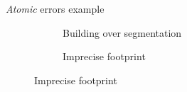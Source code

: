\documentclass{beamer}
\begin{document}
\begin{frame}{\emph{Atomic} errors example}
{\begin{figure}
\begin{center}
                            \hspace{10pt}
                            \begin{subfigure}{.28\textwidth}
                                \caption{\label{fig::bul_over} Building over segmentation}
                            \end{subfigure}
                            \hspace{10pt}
                            \begin{subfigure}{.28\textwidth}
                                \caption{\label{fig::bul_footprint} Imprecise footprint}
                            \end{subfigure}

\end{center}
\end{figure}}
\end{frame}
\end{document}
